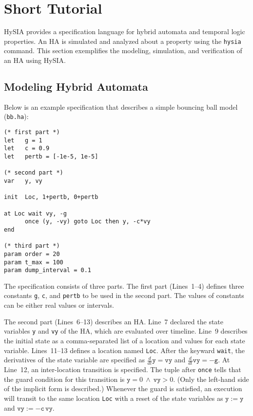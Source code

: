 \documentclass[12pt,a4paper]{article}
\begin{document}
\section{Short Tutorial}

HySIA provides a specification language for hybrid automata and temporal logic properties.
An HA is simulated and analyzed about a property using the \verb|hysia| command.
This section exemplifies the modeling, simulation, and verification of an HA using HySIA.

\subsection{Modeling Hybrid Automata}

Below is an example specification that describes a simple bouncing ball model (\texttt{bb.ha}):
\begin{lstlisting}
(* first part *)
let   g = 1
let   c = 0.9
let   pertb = [-1e-5, 1e-5]

(* second part *)
var   y, vy

init  Loc, 1+pertb, 0+pertb

at Loc wait vy, -g
      once (y, -vy) goto Loc then y, -c*vy
end

(* third part *)
param order = 20
param t_max = 100
param dump_interval = 0.1
\end{lstlisting}
%
The specification consists of three parts.
The first part (Lines~1--4) defines three constants \verb|g|, \verb|c|, and \verb|pertb| to be used in the second part.
The values of constants can be either real values or intervals.

The second part (Lines~6--13) describes an HA.
Line~7 declared the state variables \verb|y| and \verb|vy| of the HA, which are evaluated over timeline.
Line~9 describes the initial state as a comma-separated list of a location and values for each state variable.
Lines~11--13 defines a location named \verb|Loc|.
After the keyward \verb|wait|, the derivatives of the state variable are specified as $\frac{d}{dt}\mathtt{y} = \mathtt{vy}$ and $\frac{d}{dt}\mathtt{vy} = -\mathtt{g}$.
At Line~12, an inter-location transition is specified.
The tuple after \verb|once| tells that the guard condition for this transition is $\mathtt{y} = 0 ~\land~ \mathtt{vy} > 0$. (Only the left-hand side of the implicit form is described.)
Whenever the guard is satisfied, an execution will transit to the same location \verb|Loc| with a reset of the state variables as $\mathtt{y} := \mathtt{y}$ and $\mathtt{vy} := -\mathtt{c}\,\mathtt{vy}$.
\end{document}
